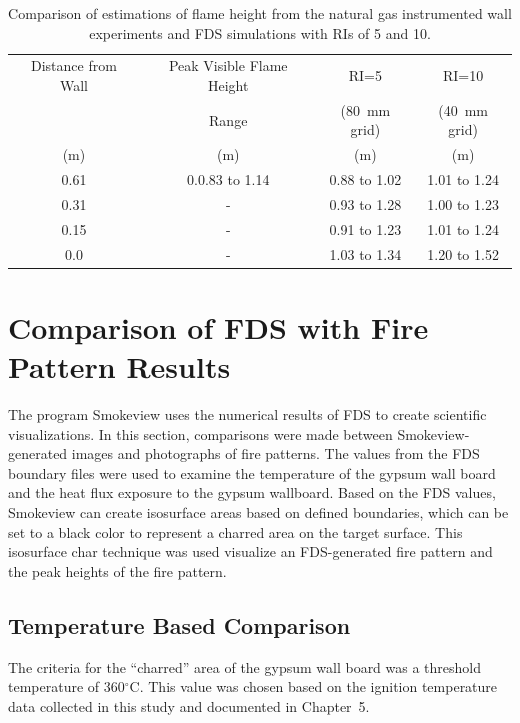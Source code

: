 \documentclass[twoside]{uocthesis}
\begin{document}
{\begin{table}[h]
  \small
  \centering
  \begin{tabular}{|c|c|c|c|} \hline 
Distance from Wall 		&  Peak Visible Flame Height 			  	& RI=5       		& RI=10      		  \\
    					&  Range          				&  (80~mm grid)  	&  (40~mm grid)  	  \\
    (m)					&  (m) 							& (m) 				& (m) 				  \\ 
\hline    0.61			&  0.0.83 to 1.14         		& 0.88 to 1.02      & 1.01 to 1.24         \\
\hline    0.31			&		-						& 0.93 to 1.28		& 1.00 to 1.23		    \\
\hline    0.15			&		-						& 0.91 to 1.23		& 1.01 to 1.24			\\
\hline	  0.0			&		-						& 1.03 to 1.34		& 1.20 to 1.52   	  \\
\hline
  \end{tabular}
  \caption[Comparison of estimations of flame height from the natural gas instrumented wall experiments and FDS simulations with RIs of 5 and 10.]{Comparison of estimations of flame height from the natural gas instrumented wall experiments and FDS simulations with RIs of 5 and 10.}
  \label{tab:FDS_FH_IWNG}
\end{table}

\section{Comparison of FDS with Fire Pattern Results}

The program Smokeview uses the numerical results of FDS to create scientific visualizations.  In this section, comparisons were made between Smokeview-generated images and photographs of fire patterns. The values from the FDS boundary files were used to examine the temperature of the gypsum wall board and the heat flux exposure to the gypsum wallboard.  Based on the FDS values, Smokeview can create isosurface areas based on defined boundaries, which can be set to a black color to represent a charred area on the target surface.  This isosurface char technique was used visualize an FDS-generated fire pattern and the peak heights of the fire pattern.

\subsection{Temperature Based Comparison}

The criteria for the ``charred'' area of the gypsum wall board was a threshold temperature of 360$^\circ$C.  This value was chosen based on the ignition temperature data collected in this study and documented in Chapter~5. 

}
\end{document}
